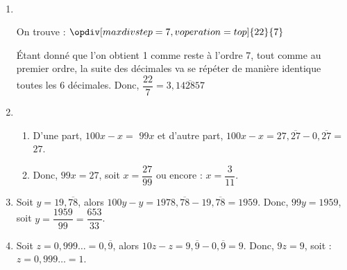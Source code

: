 \ \\ [-5mm]
   \begin{enumerate}
      \item \\
         \begin{minipage}{8cm}
            On trouve : $\opdiv[maxdivstep=7,voperation=top]{22}{7}$ \medskip
         \end{minipage}
         \begin{minipage}{6cm}
            Étant donné que l'on obtient 1 comme reste à l'ordre 7, tout comme au premier ordre, la suite des décimales va se répéter de manière identique toutes les 6 décimales. Donc, {\blue $\dfrac{22}{7} =3,\overline{142857}$}
         \end{minipage}
      \item
         \begin{enumerate}
            \item D'une part, $100x-x =$ {\blue  $99x$} et d'autre part, $100x-x =27,\overline{27}-0,\overline{27} =$ {\blue $27$}. \smallskip
            \item Donc, $99x =27$, soit $x =\dfrac{27}{99}$ ou encore : {\blue $x =\dfrac{3}{11}$}. \smallskip
         \end{enumerate}
      \setcounter{enumi}{2}
      \item Soit $y =19,\overline{78}$, alors $100y-y =1978,\overline{78}-19,\overline{78} =1959$. Donc, $99y =1959$, soit $y =\dfrac{1959}{99} =${\blue $\dfrac{653}{33}$}. \smallskip
      \item Soit $z =0,999\dots =0,\overline{9}$, alors $10z-z =9,\overline{9}-0,\overline{9} =9$. Donc, $9z =9$, soit : {\blue $z =0,999\dots =1$.}
   \end{enumerate}
